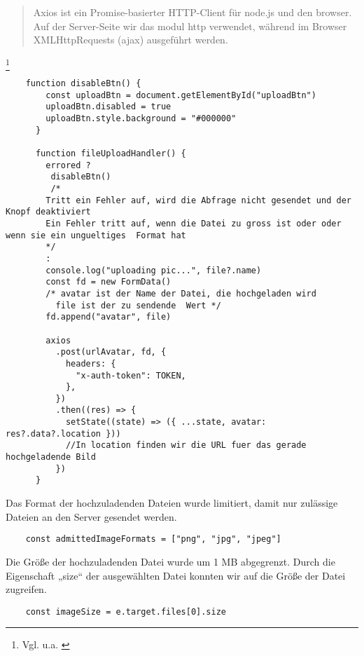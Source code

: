 \begin{quote}
  Axios ist ein Promise-basierter HTTP-Client für node.js und den browser. Auf der Server-Seite wir das modul http verwendet, während im Browser XMLHttpRequests (ajax) ausgeführt werden.
\end{quote}\footnote{Vgl. u.a. \cite{AX1}}

\begin{lstlisting}
    function disableBtn() {
        const uploadBtn = document.getElementById("uploadBtn")
        uploadBtn.disabled = true
        uploadBtn.style.background = "#000000"
      }
    
      function fileUploadHandler() {
        errored ? 
         disableBtn()
         /*
        Tritt ein Fehler auf, wird die Abfrage nicht gesendet und der Knopf deaktiviert 
        Ein Fehler tritt auf, wenn die Datei zu gross ist oder oder wenn sie ein ungueltiges  Format hat
        */
        :
        console.log("uploading pic...", file?.name)
        const fd = new FormData()
        /* avatar ist der Name der Datei, die hochgeladen wird
          file ist der zu sendende  Wert */
        fd.append("avatar", file)  
    
        axios
          .post(urlAvatar, fd, {
            headers: {
              "x-auth-token": TOKEN,
            },
          })
          .then((res) => {
            setState((state) => ({ ...state, avatar: res?.data?.location }))    
            //In location finden wir die URL fuer das gerade hochgeladende Bild 
          })
      }\end{lstlisting}



Das Format der hochzuladenden Dateien wurde limitiert, damit nur zulässige Dateien an den Server gesendet werden.
\begin{lstlisting}
    const admittedImageFormats = ["png", "jpg", "jpeg"]
\end{lstlisting}

Die Größe der hochzuladenden Datei wurde um 1 MB abgegrenzt.
Durch die Eigenschaft „size“ der ausgewählten Datei konnten wir auf die Größe der Datei zugreifen.
\begin{lstlisting}
    const imageSize = e.target.files[0].size
\end{lstlisting}